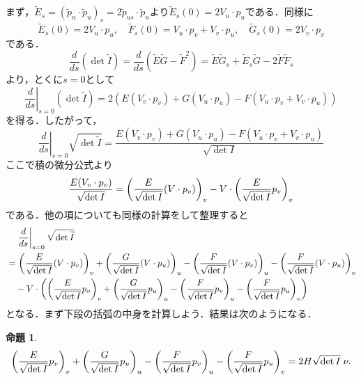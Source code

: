 \documentclass[a4j]{ltjsarticle}
\numberwithin{equation}{section}
\theoremstyle{definition}
\newtheorem{prop}[thm]{命題}
\begin{document}
まず，$\widetilde{E}_s=(\widetilde{p}_u\cdot \widetilde{p}_u)_s=2\widetilde{p}_{us}\cdot \widetilde{p}_u$より$\widetilde{E}_s(0)=2V_u\cdot p_u$である．同様に
\begin{equation}
    \widetilde{E}_s(0)=2V_u\cdot p_u,\quad \widetilde{F}_s(0)=V_u\cdot p_v+V_v\cdot p_u,\quad \widetilde{G}_s(0)=2V_v\cdot p_v 
\end{equation}
である．
\begin{equation}
    \frac{d}{ds}(\det \widetilde{I})=\frac{d}{ds}(\widetilde{E}\widetilde{G}-\widetilde{F}^2)=\widetilde{E}\widetilde{G}_s+\widetilde{E}_s\widetilde{G}-2\widetilde{F}\widetilde{F}_s
\end{equation}
より，とくに$s=0$として 
\begin{equation}
    \left.\frac{d}{ds}\right|_{s=0}(\det \widetilde{I})=2(E(V_v\cdot p_v)+G(V_u\cdot p_u)-F(V_u\cdot p_v+V_v\cdot p_u))
\end{equation}
を得る．したがって，
\begin{equation}
    \left.\frac{d}{ds}\right|_{s=0}\sqrt{\det \widetilde{I}}=\frac{E(V_v\cdot p_v)+G(V_u\cdot p_u)-F(V_u\cdot p_v+V_v\cdot p_u)}{\sqrt{\det I}}
\end{equation}
ここで積の微分公式より
\begin{equation}
    \frac{E(V_v\cdot p_v)}{\sqrt{\det I}}=\qty(\frac{E}{\sqrt{\det I}}(V\cdot p_v))_v-V\cdot \qty(\frac{E}{\sqrt{\det I}}p_v)_v
\end{equation}
である．他の項についても同様の計算をして整理すると
\begin{align}
    \begin{split}
        &\quad \left.\frac{d}{ds}\right|_{s=0}\sqrt{\det \widetilde{I}}\\
    &=\qty(\frac{E}{\sqrt{\det I}}(V\cdot p_v))_v+\qty(\frac{G}{\sqrt{\det I}}(V\cdot p_u))_u-\qty(\frac{F}{\sqrt{\det I}}(V\cdot p_v))_u-\qty(\frac{F}{\sqrt{\det I}}(V\cdot p_u))_v\\
    &\quad -V\cdot \qty(\qty(\frac{E}{\sqrt{\det I}}p_v)_v+\qty(\frac{G}{\sqrt{\det I}}p_u)_u-\qty(\frac{F}{\sqrt{\det I}}p_v)_u-\qty(\frac{F}{\sqrt{\det I}}p_u)_v)
    \end{split}\label{eq:der_area_element}
\end{align}
となる．まず下段の括弧の中身を計算しよう．結果は次のようになる．
\begin{prop}\label{prop:prep1}
    \begin{equation}
        \qty(\frac{E}{\sqrt{\det I}}p_v)_v+\qty(\frac{G}{\sqrt{\det I}}p_u)_u-\qty(\frac{F}{\sqrt{\det I}}p_v)_u-\qty(\frac{F}{\sqrt{\det I}}p_u)_v=2H\sqrt{\det I}\;\nu.
    \end{equation}
\end{prop} 
\end{document}

